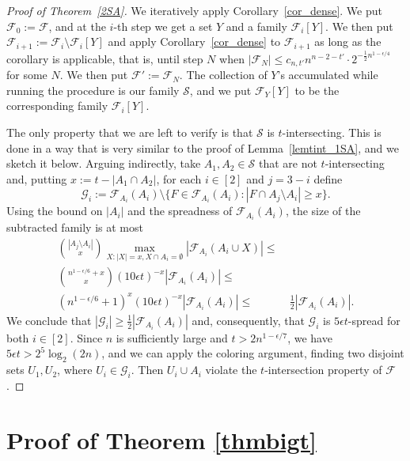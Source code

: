 \documentclass[11pt,letterpaper]{amsart}
\renewcommand{\le}{\leqslant}
\renewcommand{\ge}{\geqslant}
\newcommand{\ff}{\mathcal{F}}
\newcommand{\s}{\mathcal{S}}
\newcommand{\g}{\mathcal{G}}
\begin{document}
\begin{proof}[Proof of Theorem~\ref{2SA}]
We iteratively apply Corollary~\ref{cor_dense}. We put $\ff_0 :=\ff$, and at the $i$-th step we get a set $Y$ and a family $\ff_i[Y]$. We then put $\ff_{i+1}:=\ff_i\setminus  \ff_i[Y]$ and apply Corollary~\ref{cor_dense} to $\ff_{i+1}$ as long as the corollary is applicable, that is, until step $N$ when $|\ff_N|\le c_{n, t'}n^{n-2-t'} \cdot 2^{-\frac 12 n^{1-\epsilon/4}}$ for some $N$. We then put $\ff':=\ff_N$. The collection of $Y$'s accumulated while running the procedure is our family $\mathcal S$, and we put $\ff_Y[Y]$ to be the corresponding family $\ff_i[Y]$.


The only property that we are left to verify is that $\s$ is $t$-intersecting. This is done in a way that is very similar to the proof of Lemma~\ref{lemtint_1SA}, and we sketch it below. Arguing indirectly, take $A_1,A_2\in \s$ that are not $t$-intersecting and, putting $x:=t-|A_1\cap A_2|$, for each $i\in [2]$ and $j=3-i$ define
 $$\g_i:=\ff_{A_i}(A_i)\setminus\Big\{F\in \ff_{A_i}(A_i): |F\cap A_j\setminus A_i|\ge x\Big\}.$$
 Using the bound on $|A_i|$ and the spreadness of $\ff_{A_i}(A_i)$, the size of the subtracted family is at most
 \begin{align*}{|A_j\setminus A_i|\choose x}\max_{X: |X| = x, X\cap A_i = \emptyset}|\ff_{A_i}(A_i\cup X)|\le&\\   {n^{1-\epsilon/6}+x\choose x}(10\epsilon t)^{-x}|\ff_{A_i}(A_i)|\le&\\
  (n^{1-\epsilon/6}+1)^x(10\epsilon t)^{-x}|\ff_{A_i}(A_i)|\le&\ \frac 12 |\ff_{A_i}(A_i)|.\end{align*}
  We conclude that $|\g_i|\ge \frac 12 |\ff_{A_i}(A_i)|$ and, consequently, that $\g_i$ is $5\epsilon t$-spread for both $i\in [2]$. Since $n$ is sufficiently large and $t>2n^{1-\epsilon/7}$, we have $5\epsilon t > 2^{5}\log_2(2n)$, and we can apply the coloring argument, finding two disjoint sets $U_1,U_2$, where $U_i\in \g_i$. Then $U_i\cup A_i$ violate the $t$-intersection property of $\ff$.
\end{proof}

\section{Proof of Theorem \ref{thmbigt}}
\end{document}
